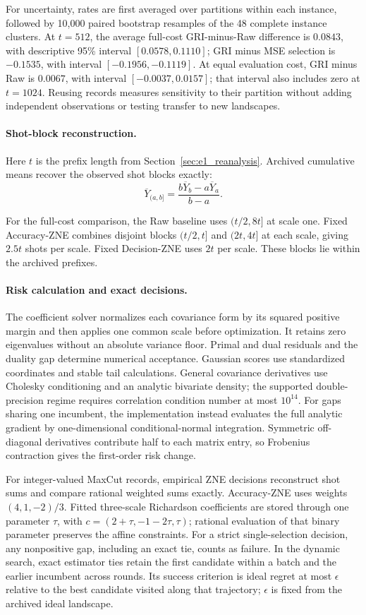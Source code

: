 \documentclass[a4paper,onecolumn,unpublished,nopdfoutputerror]{quantumarticle}
\theoremstyle{plain}
\theoremstyle{definition}
\newcommand{\1}{\mathbf{1}}
\begin{document}
For uncertainty, rates are first averaged over partitions within each instance, followed by 10,000 paired bootstrap resamples of the 48 complete instance clusters. At $t=512$, the average full-cost GRI-minus-Raw difference is $0.0843$, with descriptive 95\% interval $[0.0578,0.1110]$; GRI minus MSE selection is $-0.1535$, with interval $[-0.1956,-0.1119]$. At equal evaluation cost, GRI minus Raw is $0.0067$, with interval $[-0.0037,0.0157]$; that interval also includes zero at $t=1024$. Reusing records measures sensitivity to their partition without adding independent observations or testing transfer to new landscapes.

\paragraph{Shot-block reconstruction.}
Here $t$ is the prefix length from Section~\ref{sec:e1_reanalysis}. Archived cumulative means recover the observed shot blocks exactly:
\[
\overline Y_{(a,b]}=\frac{b\overline Y_b-a\overline Y_a}{b-a}.
\]

For the full-cost comparison, the Raw baseline uses $(t/2,8t]$ at scale one. Fixed Accuracy-ZNE combines disjoint blocks $(t/2,t]$ and $(2t,4t]$ at each scale, giving $2.5t$ shots per scale. Fixed Decision-ZNE uses $2t$ per scale. These blocks lie within the archived prefixes.

\paragraph{Risk calculation and exact decisions.}
The coefficient solver normalizes each covariance form by its squared positive margin and then applies one common scale before optimization. It retains zero eigenvalues without an absolute variance floor. Primal and dual residuals and the duality gap determine numerical acceptance. Gaussian scores use standardized coordinates and stable tail calculations. General covariance derivatives use Cholesky conditioning and an analytic bivariate density; the supported double-precision regime requires correlation condition number at most $10^{14}$. For gaps sharing one incumbent, the implementation instead evaluates the full analytic gradient by one-dimensional conditional-normal integration. Symmetric off-diagonal derivatives contribute half to each matrix entry, so Frobenius contraction gives the first-order risk change.

For integer-valued MaxCut records, empirical ZNE decisions reconstruct shot sums and compare rational weighted sums exactly. Accuracy-ZNE uses weights $(4,1,-2)/3$. Fitted three-scale Richardson coefficients are stored through one parameter $\tau$, with $c=(2+\tau,-1-2\tau,\tau)$; rational evaluation of that binary parameter preserves the affine constraints. For a strict single-selection decision, any nonpositive gap, including an exact tie, counts as failure. In the dynamic search, exact estimator ties retain the first candidate within a batch and the earlier incumbent across rounds. Its success criterion is ideal regret at most $\epsilon$ relative to the best candidate visited along that trajectory; $\epsilon$ is fixed from the archived ideal landscape.
\end{document}
